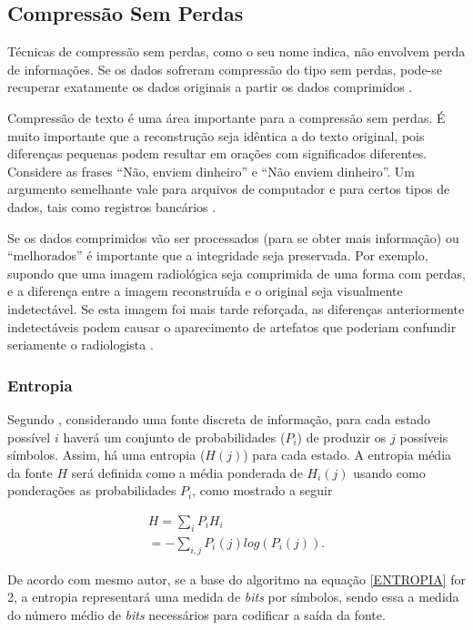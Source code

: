 \subsection{Compressão Sem Perdas}
Técnicas de compressão sem perdas, como o seu nome indica, não envolvem perda de informações. Se os dados sofreram compressão do tipo sem perdas, pode-se recuperar exatamente os dados originais a partir  os dados comprimidos \cite{ukrit2011survey}.

Compressão de texto é uma área importante para a compressão sem perdas. É muito importante que a reconstrução seja idêntica a do texto original, pois diferenças pequenas podem resultar em orações com significados diferentes. Considere as frases \enquote{Não, enviem dinheiro} e \enquote{Não enviem dinheiro}. Um argumento semelhante vale para arquivos de computador e para certos tipos de dados, tais como registros bancários \cite{sayood2012introduction}.

Se os dados comprimidos vão ser processados (para se obter mais informação) ou \enquote{melhorados} é importante que a integridade seja preservada. Por exemplo, supondo que uma imagem radiológica seja comprimida de uma forma com perdas, e a diferença entre a imagem reconstruída e o original seja visualmente indetectável. Se esta imagem foi mais tarde reforçada, as diferenças anteriormente indetectáveis podem causar o aparecimento de artefatos que poderiam confundir seriamente o radiologista \cite{sayood2012introduction}.

\subsubsection{Entropia}

Segundo \cite{shannon2001mathematical}, considerando uma fonte discreta de informação, para cada estado possível $i$ haverá um conjunto de probabilidades ($P_i$) de produzir os $j$ possíveis símbolos. Assim, há uma entropia ($H(j)$) para cada estado. A entropia média da fonte $H$ será definida como a média ponderada de $H_i(j)$ usando como ponderações as probabilidades $P_i$, como mostrado a seguir

\begin{equation}
\label{ENTROPIA}
	\begin{split}
		H = \sum_i P_iH_i\\
		= - \sum_{i,j} P_i(j) log(P_i(j)).
	\end{split}
\end{equation}

De acordo com mesmo autor, se a base do algoritmo na equação \ref{ENTROPIA} for 2, a entropia representará uma medida de \textit{bits} por símbolos, sendo essa a medida do número médio de \textit{bits} necessários para codificar a saída da fonte. 

